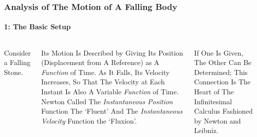 \begin{frame}
\frametitle{Analysis of The Motion of \alert{A Falling Body}}
\framesubtitle{1: The Basic Setup}
\label{slide:analysis-of-falling-body-1}

\begin{columns}[c]
\alert{Consider a Falling Stone.} 

Its Motion Is Described by Giving Its Position (Displacement from A Reference) as A \textit{Function} of Time. \alert{As It Falls, Its Velocity Increases}, So That The \alert{Velocity at Each Instant Is Also A Variable \textit{Function} of Time}.  Newton Called \alert{The \textit{Instantaneous Position} Function The `Fluent'} And \alert{The \textit{Instantaneous Velocity} Function the `Fluxion'}. 

If One Is Given, The Other Can Be Determined; \alert{This Connection Is The Heart of The Infinitesimal Calculus Fashioned by Newton and Leibniz}.
\def\scale{0.4}
\def\xtime{0}
\def\xdisp{2.2}
\def\xvel{4.8}
\end{columns}
\end{frame}
